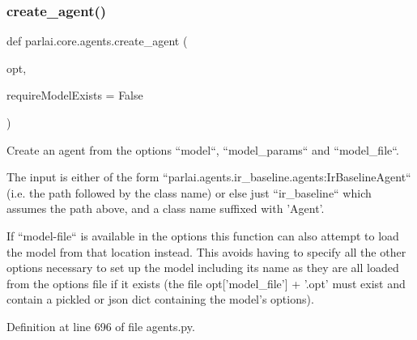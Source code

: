 \subsubsection{\texorpdfstring{create\+\_\+agent()}{create\_agent()}}
{\footnotesize\ttfamily def parlai.\+core.\+agents.\+create\+\_\+agent (\begin{DoxyParamCaption}\item[{}]{opt,  }\item[{}]{require\+Model\+Exists = {\ttfamily False} }\end{DoxyParamCaption})}

\begin{DoxyVerb}Create an agent from the options ``model``, ``model_params`` and ``model_file``.

The input is either of the form
``parlai.agents.ir_baseline.agents:IrBaselineAgent`` (i.e. the path
followed by the class name) or else just ``ir_baseline`` which
assumes the path above, and a class name suffixed with 'Agent'.

If ``model-file`` is available in the options this function can also
attempt to load the model from that location instead. This avoids having to
specify all the other options necessary to set up the model including its
name as they are all loaded from the options file if it exists (the file
opt['model_file'] + '.opt' must exist and contain a pickled or json dict
containing the model's options).
\end{DoxyVerb}
 

Definition at line 696 of file agents.\+py.


